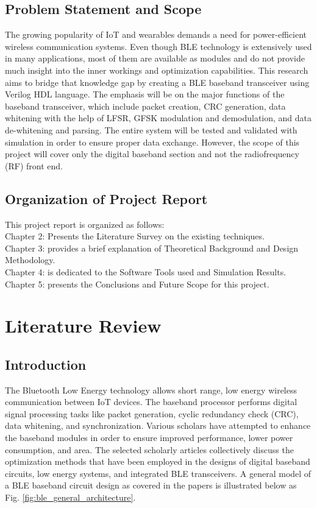 \documentclass[12pt,singleside,a4paper]{report}
\begin{document}
\section{Problem Statement and Scope}
The growing popularity of IoT and wearables demands a need for power-efficient wireless communication systems. Even though BLE technology is extensively used in many applications, most of them are available as modules and do not provide much insight into the inner workings and optimization capabilities. This research aims to bridge that knowledge gap by creating a BLE baseband transceiver using Verilog HDL language. The emphasis will be on the major functions of the baseband transceiver, which include packet creation, CRC generation, data whitening with the help of LFSR, GFSK modulation and demodulation, and data de-whitening and parsing. The entire system will be tested and validated with simulation in order to ensure proper data exchange. However, the scope of this project will cover only the digital baseband section and not the radiofrequency (RF) front end.

\section{Organization of Project Report}
This project report is organized as follows:\\
Chapter 2: Presents the Literature Survey on the existing techniques.\\ 
Chapter 3: provides a brief explanation of Theoretical Background and Design Methodology.\\
Chapter 4: is dedicated to the Software Tools used and Simulation Results.\\
Chapter 5: presents the Conclusions and Future Scope for this project.\\

\chapter{Literature Review}

\section{Introduction}
The Bluetooth Low Energy technology allows short range, low energy wireless
communication between IoT devices. The baseband processor performs digital signal
processing tasks like packet generation, cyclic redundancy check (CRC), data
whitening, and synchronization. Various scholars have attempted to enhance the baseband
modules in order to ensure improved performance, lower power consumption, and area.
The selected scholarly articles collectively discuss the optimization methods that
have been employed in the designs of digital baseband circuits, low energy systems,
and integrated BLE transceivers. A general model of a BLE baseband circuit design
as covered in the papers is illustrated below as Fig. \ref{fig:ble_general_architecture}.
\end{document}
